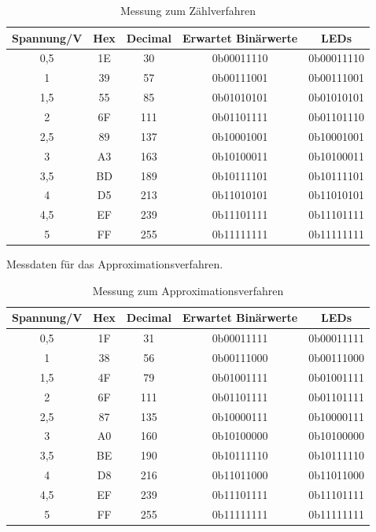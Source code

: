 \documentclass[12pt,a4paper]{article}
\begin{document}
\begin{table}[htbp]
\begin{center}
\begin{tabular}{|c|c|c|c|c|}
\hline
\multicolumn{1}{|l|}{Spannung/V} & Hex & \multicolumn{1}{l|}{Decimal} & \multicolumn{1}{l|}{Erwartet Binärwerte} & LEDs \\ \hline
0,5 & 1E & 30 & 0b00011110 & 0b00011110 \\ \hline
1 & 39 & 57 & 0b00111001 & 0b00111001 \\ \hline
1,5 & 55 & 85 & 0b01010101 & 0b01010101 \\ \hline
2 & 6F & 111 & 0b01101111 & 0b01101110 \\ \hline
2,5 & 89 & 137 & 0b10001001 & 0b10001001 \\ \hline
3 & A3 & 163 & 0b10100011 & 0b10100011 \\ \hline
3,5 & BD & 189 & 0b10111101 & 0b10111101 \\ \hline
4 & D5 & 213 & 0b11010101 & 0b11010101 \\ \hline
4,5 & EF & 239 & 0b11101111 & 0b11101111 \\ \hline
5 & FF & 255 & 0b11111111 & 0b11111111 \\ \hline
\end{tabular}
\end{center}
\caption{Messung zum Zählverfahren}
\label{tab:zaehl}
\end{table}

Messdaten für das Approximationsverfahren.

\begin{table}[htbp]
\begin{center}
\begin{tabular}{|c|c|c|c|c|}
\hline
\multicolumn{1}{|l|}{Spannung/V} & Hex & \multicolumn{1}{l|}{Decimal} & \multicolumn{1}{l|}{Erwartet Binärwerte} & LEDs \\ \hline
0,5 & 1F & 31 & 0b00011111 & 0b00011111 \\ \hline
1 & 38 & 56 & 0b00111000 & 0b00111000 \\ \hline
1,5 & 4F & 79 & 0b01001111 & 0b01001111 \\ \hline
2 & 6F & 111 & 0b01101111 & 0b01101111 \\ \hline
2,5 & 87 & 135 & 0b10000111 & 0b10000111 \\ \hline
3 & A0 & 160 & 0b10100000 & 0b10100000 \\ \hline
3,5 & BE & 190 & 0b10111110 & 0b10111110 \\ \hline
4 & D8 & 216 & 0b11011000 & 0b11011000 \\ \hline
4,5 & EF & 239 & 0b11101111 & 0b11101111 \\ \hline
5 & FF & 255 & 0b11111111 & 0b11111111 \\ \hline
\end{tabular}
\end{center}
\caption{Messung zum Approximationsverfahren}
\label{tab:approx}
\end{table}
\end{document}

